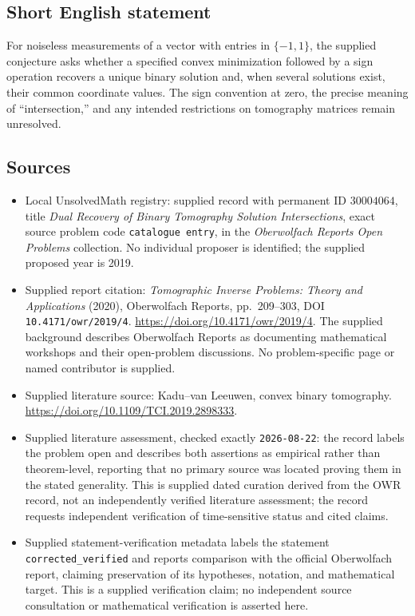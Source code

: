 \documentclass[11pt]{article}
\begin{document}
\subsection{Short English statement}
For noiseless measurements of a vector with entries in \(\{-1,1\}\), the supplied conjecture asks whether a specified convex minimization followed by a sign operation recovers a unique binary solution and, when several solutions exist, their common coordinate values. The sign convention at zero, the precise meaning of ``intersection,'' and any intended restrictions on tomography matrices remain unresolved.
\subsection{Sources}
\begin{itemize}
\item Local UnsolvedMath registry: supplied record with permanent ID \(30004064\), title \emph{Dual Recovery of Binary Tomography Solution Intersections}, exact source problem code \texttt{catalogue entry}, in the \emph{Oberwolfach Reports Open Problems} collection. No individual proposer is identified; the supplied proposed year is 2019.
\item Supplied report citation: \emph{Tomographic Inverse Problems: Theory and Applications} (2020), Oberwolfach Reports, pp.~209--303, DOI \texttt{10.4171/owr/2019/4}. \url{https://doi.org/10.4171/owr/2019/4}. The supplied background describes Oberwolfach Reports as documenting mathematical workshops and their open-problem discussions. No problem-specific page or named contributor is supplied.
\item Supplied literature source: Kadu--van Leeuwen, convex binary tomography. \url{https://doi.org/10.1109/TCI.2019.2898333}.
\item Supplied literature assessment, checked exactly \texttt{2026-08-22}: the record labels the problem open and describes both assertions as empirical rather than theorem-level, reporting that no primary source was located proving them in the stated generality. This is supplied dated curation derived from the OWR record, not an independently verified literature assessment; the record requests independent verification of time-sensitive status and cited claims.
\item Supplied statement-verification metadata labels the statement \texttt{corrected\_verified} and reports comparison with the official Oberwolfach report, claiming preservation of its hypotheses, notation, and mathematical target. This is a supplied verification claim; no independent source consultation or mathematical verification is asserted here.
\end{itemize}
\end{document}
